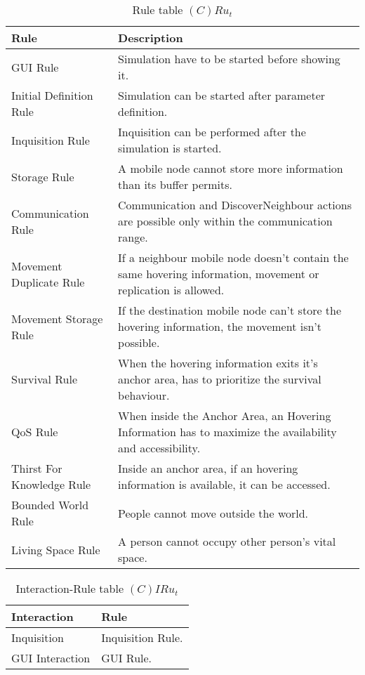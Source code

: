 \begin{table}[H]
	\centering
	\begin{tabular}{|p{4cm}|p{8cm}|}
			\hline
			\textbf{Rule} & \textbf{Description} \\
			\hline
			GUI Rule & Simulation have to be started before showing it.\\
			\hline
			Initial Definition Rule & Simulation can be started after parameter definition.\\
			\hline
			Inquisition Rule & Inquisition can be performed after the simulation is
			started.\\
			\hline
			Storage Rule & A mobile node cannot store more information than its
			buffer permits. \\
			\hline
			Communication Rule & Communication and DiscoverNeighbour actions are
			possible only within the communication range. \\
			\hline
			Movement Duplicate Rule & If a neighbour mobile node doesn't contain the same
			hovering information, movement or replication is allowed. \\
			\hline
			Movement Storage Rule & If the destination mobile node can't store the hovering
			information, the movement isn't possible. \\
			\hline
			Survival Rule & When the hovering information exits it's anchor area, has
			to prioritize the survival behaviour.\\
			\hline
			QoS Rule & When inside the Anchor Area, an Hovering Information has to
			maximize the availability and accessibility.\\
			\hline
			Thirst For Knowledge Rule & Inside an anchor area, if an hovering
			information is available, it can be accessed.\\
			\hline
			Bounded World Rule & People cannot move outside the world. \\
			\hline
			Living Space Rule & A person cannot occupy other person's vital space. \\
			\hline
		\end{tabular}
	\caption{Rule table $(C)Ru_t$}
	\label{tab:crut}
\end{table}

\begin{table}[H]
	\centering
	\begin{tabular}{|p{4cm}|p{8cm}|}
			\hline
			\textbf{Interaction} & \textbf{Rule} \\
			\hline
			Inquisition & Inquisition Rule. \\
			\hline
			GUI Interaction & GUI Rule. \\
			\hline
		\end{tabular}
	\caption{Interaction-Rule table $(C)IRu_t$}
	\label{tab:cirut}
\end{table}

